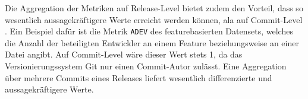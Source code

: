 Die Aggregation der Metriken auf Release-Level bietet zudem den Vorteil, dass so wesentlich aussagekräftigere Werte erreicht werden können, ala auf Commit-Level \cite{Zimmermann2007}. Ein Beispiel dafür ist die Metrik \texttt{ADEV} des featurebasierten Datensets, welches die Anzahl der beteiligten Entwickler an einem Feature beziehungsweise an einer Datei angibt. Auf Commit-Level wäre dieser Wert stets 1, da das Versionierungssystem Git nur einen Commit-Autor zulässt. Eine Aggregation über mehrere Commits eines Releases liefert wesentlich differenzierte und aussagekräftigere Werte.

\cleardoublepage

%
